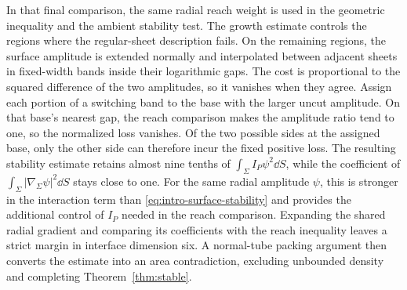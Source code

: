 In that final comparison, the same radial reach weight is used
in the geometric inequality and the ambient stability test.
The growth estimate controls the regions where the regular-sheet
description fails.
On the remaining regions, the surface amplitude is extended normally
and interpolated between adjacent sheets in fixed-width bands
inside their logarithmic gaps.
The cost is proportional to the squared difference of the two
amplitudes, so it vanishes when they agree.
Assign each portion of a switching band to the base with the larger
uncut amplitude.  On that base's nearest gap, the reach comparison
makes the amplitude ratio tend to one, so the normalized loss vanishes.
Of the two possible sides at the assigned base, only the other side
can therefore incur the fixed positive loss.
The resulting stability estimate retains almost nine tenths of
$\int_\Sigma I_P\psi^2\dd S$, while the coefficient of
$\int_\Sigma|\nabla_\Sigma\psi|^2\dd S$ stays close to one.
For the same radial amplitude $\psi$, this is stronger in the
interaction term than \eqref{eq:intro-surface-stability} and
provides the additional control of $I_P$ needed in the reach comparison.
Expanding the shared radial gradient and comparing its coefficients
with the reach inequality leaves a strict margin in interface dimension
six.  A normal-tube packing argument then converts the
estimate into an area contradiction, excluding unbounded density
and completing Theorem~\ref{thm:stable}.

